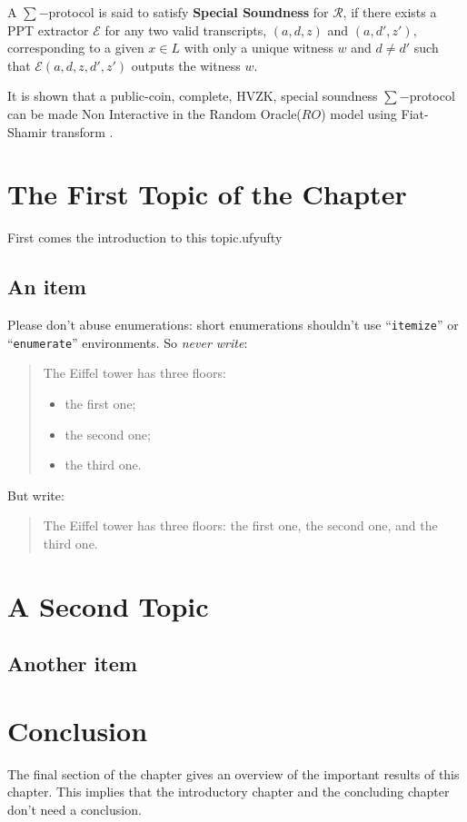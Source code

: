 \begin{definition}
  A $\sum-$protocol is said to satisfy \textbf{Special Soundness} for $\mathcal{R}$, 
  if there exists a PPT extractor $\mathcal{E}$ for any two valid transcripts, $(a,d,z)$ and 
  $(a,d',z')$, corresponding to a given $x\in L$ with only a unique witness $w$ and $d\neq d'$ such that $\mathcal{E}(a,d,z,d',z')$ outputs the 
  witness $w$. 
\end{definition}

It is shown that a public-coin, complete, HVZK, special soundness $\sum-$protocol can be made 
Non Interactive in the Random Oracle($RO$) model using Fiat-Shamir transform \cite{10.1007/3-540-47721-7_12}. 


\section{The First Topic of the Chapter}
First comes the introduction to this topic.ufyufty

\lipsum[55]

\subsection{An item}
Please don't abuse enumerations: short enumerations shouldn't use
``\verb|itemize|'' or ``\texttt{enumerate}'' environments.
So \emph{never write}: 
\begin{quote}
  The Eiffel tower has three floors:
  \begin{itemize}
  \item the first one;
  \item the second one;
  \item the third one.
  \end{itemize}
\end{quote}
But write:
\begin{quote}
  The Eiffel tower has three floors: the first one, the second one, and the
  third one.
\end{quote}

\section{A Second Topic}
\lipsum[64]

\subsection{Another item}
\lipsum[56-57]

\section{Conclusion}
The final section of the chapter gives an overview of the important results
of this chapter. This implies that the introductory chapter and the
concluding chapter don't need a conclusion.

\lipsum[66]

